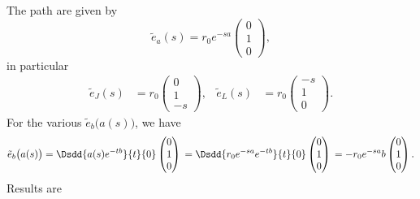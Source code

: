 The path are given by
\begin{equation}
	\tilde{e}_a(s)=r_0 e^{-sa}\begin{pmatrix}
		0 \\1\\0
	\end{pmatrix},
\end{equation}
in particular
\begin{align}
	\tilde{e}_J(s) & =r_0\begin{pmatrix}
		                     0 \\1\\-s
	                     \end{pmatrix},
	               & \tilde{e}_L(s)      & =r_0\begin{pmatrix}
		                                           -s \\1\\0
	                                           \end{pmatrix}.
\end{align}
For the various $\tilde{e}_b\big( a(s) \big)$, we have
\begin{equation}
	\tilde{e}_b\big( a(s) \big)=\Dsdd{ a(s) e^{-tb} }{t}{0}\begin{pmatrix}
		0 \\1\\0
	\end{pmatrix}\\
	=\Dsdd{ r_0 e^{-sa} e^{-tb} }{t}{0}\begin{pmatrix}
		0 \\1\\0
	\end{pmatrix}\\
	=-r_0 e^{-sa}b\begin{pmatrix}
		0 \\1\\0
	\end{pmatrix}.
\end{equation}
Results are
